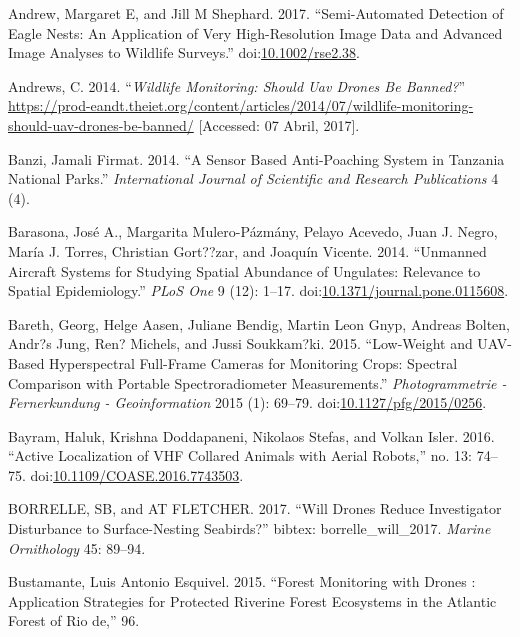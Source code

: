 \documentclass[]{interact}
\theoremstyle{plain}%
\theoremstyle{definition}
\theoremstyle{remark}
\begin{document}
\hypertarget{ref-andrew_semi-automated_2017}{}
Andrew, Margaret E, and Jill M Shephard. 2017. ``Semi-Automated
Detection of Eagle Nests: An Application of Very High-Resolution Image
Data and Advanced Image Analyses to Wildlife Surveys.''
doi:\href{https://doi.org/10.1002/rse2.38}{10.1002/rse2.38}.

\hypertarget{ref-Andrews2014}{}
Andrews, C. 2014. ``\emph{Wildlife Monitoring: Should Uav Drones Be
Banned?}''
\url{https://prod-eandt.theiet.org/content/articles/2014/07/wildlife-monitoring-should-uav-drones-be-banned/}
{[}Accessed: 07 Abril, 2017{]}.

\hypertarget{ref-banzi_sensor_2014}{}
Banzi, Jamali Firmat. 2014. ``A Sensor Based Anti-Poaching System in
Tanzania National Parks.'' \emph{International Journal of Scientific and
Research Publications} 4 (4).

\hypertarget{ref-barasona_unmanned_2014}{}
Barasona, José A., Margarita Mulero-Pázmány, Pelayo Acevedo, Juan J.
Negro, María J. Torres, Christian Gort??zar, and Joaquín Vicente. 2014.
``Unmanned Aircraft Systems for Studying Spatial Abundance of Ungulates:
Relevance to Spatial Epidemiology.'' \emph{PLoS One} 9 (12): 1--17.
doi:\href{https://doi.org/10.1371/journal.pone.0115608}{10.1371/journal.pone.0115608}.

\hypertarget{ref-bareth_low-weight_2015}{}
Bareth, Georg, Helge Aasen, Juliane Bendig, Martin Leon Gnyp, Andreas
Bolten, Andr?s Jung, Ren? Michels, and Jussi Soukkam?ki. 2015.
``Low-Weight and UAV-Based Hyperspectral Full-Frame Cameras for
Monitoring Crops: Spectral Comparison with Portable Spectroradiometer
Measurements.'' \emph{Photogrammetrie - Fernerkundung - Geoinformation}
2015 (1): 69--79.
doi:\href{https://doi.org/10.1127/pfg/2015/0256}{10.1127/pfg/2015/0256}.

\hypertarget{ref-bayram_active_2016}{}
Bayram, Haluk, Krishna Doddapaneni, Nikolaos Stefas, and Volkan Isler.
2016. ``Active Localization of VHF Collared Animals with Aerial
Robots,'' no. 13: 74--75.
doi:\href{https://doi.org/10.1109/COASE.2016.7743503}{10.1109/COASE.2016.7743503}.

\hypertarget{ref-borrelle_will_2017}{}
BORRELLE, SB, and AT FLETCHER. 2017. ``Will Drones Reduce Investigator
Disturbance to Surface-Nesting Seabirds?'' bibtex: borrelle\_will\_2017.
\emph{Marine Ornithology} 45: 89--94.

\hypertarget{ref-bustamante_forest_2015}{}
Bustamante, Luis Antonio Esquivel. 2015. ``Forest Monitoring with Drones
: Application Strategies for Protected Riverine Forest Ecosystems in the
Atlantic Forest of Rio de,'' 96.
\end{document}
